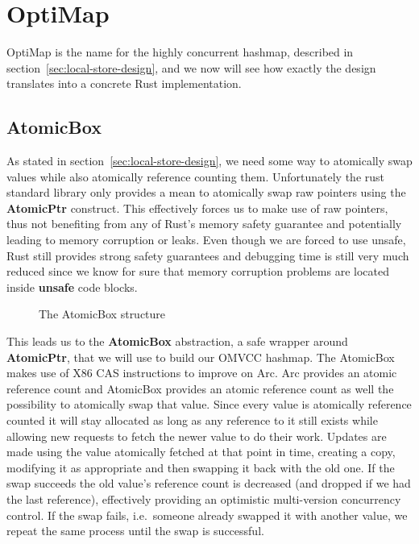 \documentclass[11pt]{book}
\begin{document}
\section{OptiMap} \label{sec:optimap-impl}

OptiMap is the name for the highly concurrent hashmap, described in
section~\ref{sec:local-store-design}, and we now will see how exactly
the design translates into a concrete Rust implementation.

\subsection{AtomicBox}

As stated in section~\ref{sec:local-store-design}, we need some way to
atomically swap values while also atomically reference counting them.
Unfortunately the rust standard library only provides a mean to
atomically swap raw pointers using the \textbf{AtomicPtr}
construct. This effectively forces us to make use of raw pointers,
thus not benefiting from any of Rust's memory safety guarantee and
potentially leading to memory corruption or leaks. Even though we are
forced to use unsafe, Rust still provides strong safety guarantees and
debugging time is still very much reduced since we know for sure that
memory corruption problems are located inside \textbf{unsafe} code
blocks.

\begin{figure}[htb!]
  
  \caption{The AtomicBox structure}
\end{figure}

This leads us to the \textbf{AtomicBox} abstraction, a safe wrapper
around \textbf{AtomicPtr}, that we will use to build our OMVCC
hashmap. The AtomicBox makes use of X86 CAS instructions to improve on
Arc. Arc provides an atomic reference count and AtomicBox provides an
atomic reference count as well the possibility to atomically swap that
value. Since every value is atomically reference counted it will stay
allocated as long as any reference to it still exists while allowing
new requests to fetch the newer value to do their work. Updates are
made using the value atomically fetched at that point in time,
creating a copy, modifying it as appropriate and then swapping it back
with the old one. If the swap succeeds the old value's reference count
is decreased (and dropped if we had the last reference), effectively
providing an optimistic multi-version concurrency control. If the swap
fails, i.e.\ someone already swapped it with another value, we repeat
the same process until the swap is successful.
\end{document}

